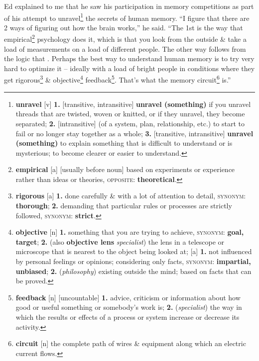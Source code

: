 \documentclass[oneside]{book}
\numberwithin{equation}{section}
\begin{document}
Ed explained to me that he saw his participation in memory competitions as part of his attempt to unravel\footnote{\textbf{unravel} [v] \textbf{1.} [transitive, intransitive] \textbf{unravel (something)} if you unravel threads that are twisted, woven or knitted, or if they unravel, they become separated; \textbf{2.} [intransitive] (of a system, plan, relationship, etc.) to start to fail or no longer stay together as a whole; \textbf{3.} [transitive, intransitive] \textbf{unravel (something)} to explain something that is difficult to understand or is mysterious; to become clearer or easier to understand.} the secrets of human memory. ``I figure that there are 2 ways of figuring out how the brain works,'' he said. ``The 1st is the way that empirical\footnote{\textbf{empirical} [a] [usually before noun] based on experiments or experience rather than ideas or theories, \textsc{opposite}: \textbf{theoretical}.} psychology does it, which is that you look from the outside \& take a load of measurements on a load of different people. The other way follows from the logic that . Perhaps the best way to understand human memory is to try very hard to optimize it -- ideally with a load of bright people in conditions where they get rigorous\footnote{\textbf{rigorous} [a] \textbf{1.} done carefully \& with a lot of attention to detail, \textsc{synonym}: \textbf{thorough}; \textbf{2.} demanding that particular rules or processes are strictly followed, \textsc{synonym}: \textbf{strict}.} \& objective\footnote{\textbf{objective} [n] \textbf{1.} something that you are trying to achieve, \textsc{synonym}: \textbf{goal, target}; \textbf{2.} (also \textbf{objective lens} \textit{specialist}) the lens in a telescope or microscope that is nearest to the object being looked at; [a] \textbf{1.} not influenced by personal feelings or opinions; considering only facts, \textsc{synonym}: \textbf{impartial, unbiased}; \textbf{2.} (\textit{philosophy}) existing outside the mind; based on facts that can be proved.} feedback\footnote{\textbf{feedback} [n] [uncountable] \textbf{1.} advice, criticism or information about how good or useful something or somebody's work is; \textbf{2.} (\textit{specialist}) the way in which the results or effects of a process or system increase or decrease its activity.}. That's what the memory circuit\footnote{\textbf{circuit} [n] the complete path of wires \& equipment along which an electric current flows.} is.''
\end{document}
